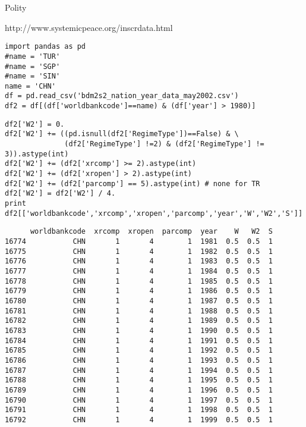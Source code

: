 \documentclass[12pt,fleqn]{article}\usepackage{common}
\begin{document}
Polity

http://www.systemicpeace.org/inscrdata.html

\begin{verbatim}
import pandas as pd
#name = 'TUR'
#name = 'SGP'
#name = 'SIN'
name = 'CHN'
df = pd.read_csv('bdm2s2_nation_year_data_may2002.csv')
df2 = df[(df['worldbankcode']==name) & (df['year'] > 1980)]
\end{verbatim}

\begin{verbatim}
df2['W2'] = 0.
df2['W2'] += ((pd.isnull(df2['RegimeType'])==False) & \
              (df2['RegimeType'] !=2) & (df2['RegimeType'] != 3)).astype(int)
df2['W2'] += (df2['xrcomp'] >= 2).astype(int)
df2['W2'] += (df2['xropen'] > 2).astype(int)
df2['W2'] += (df2['parcomp'] == 5).astype(int) # none for TR
df2['W2'] = df2['W2'] / 4.
print df2[['worldbankcode','xrcomp','xropen','parcomp','year','W','W2','S']]
\end{verbatim}

\begin{verbatim}
      worldbankcode  xrcomp  xropen  parcomp  year    W   W2  S
16774           CHN       1       4        1  1981  0.5  0.5  1
16775           CHN       1       4        1  1982  0.5  0.5  1
16776           CHN       1       4        1  1983  0.5  0.5  1
16777           CHN       1       4        1  1984  0.5  0.5  1
16778           CHN       1       4        1  1985  0.5  0.5  1
16779           CHN       1       4        1  1986  0.5  0.5  1
16780           CHN       1       4        1  1987  0.5  0.5  1
16781           CHN       1       4        1  1988  0.5  0.5  1
16782           CHN       1       4        1  1989  0.5  0.5  1
16783           CHN       1       4        1  1990  0.5  0.5  1
16784           CHN       1       4        1  1991  0.5  0.5  1
16785           CHN       1       4        1  1992  0.5  0.5  1
16786           CHN       1       4        1  1993  0.5  0.5  1
16787           CHN       1       4        1  1994  0.5  0.5  1
16788           CHN       1       4        1  1995  0.5  0.5  1
16789           CHN       1       4        1  1996  0.5  0.5  1
16790           CHN       1       4        1  1997  0.5  0.5  1
16791           CHN       1       4        1  1998  0.5  0.5  1
16792           CHN       1       4        1  1999  0.5  0.5  1
\end{verbatim}

\end{document}
